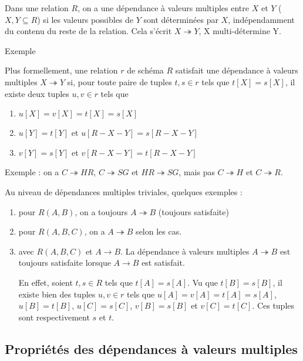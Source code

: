 	Dans une relation $R$, on a une dépendance à valeurs multiples entre $X$ et $Y$ ($X, Y \subseteq R$) si les valeurs possibles de $Y$ sont déterminées par $X$, indépendamment du contenu du reste de la relation. Cela s'écrit $X \twoheadrightarrow Y$, X multi-détermine Y.
	
	Exemple
	
	
	Plus formellement, une relation $r$ de schéma $R$ satisfait une dépendance à valeurs multiples $X \twoheadrightarrow Y$ si, pour toute paire de tuples $t, s \in r$ tels que $t[X] = s[X]$, il existe deux tuples $u, v \in r$ tels que
	
	\begin{enumerate}
		\item $u[X] = v[X] = t[X] = s[X]$
		\item $u[Y] = t[Y]$ et $u[R - X - Y] = s[R - X - Y]$
		\item $v[Y] = s[Y]$ et $v[R - X - Y] = t[R - X - Y]$
	\end{enumerate}
	

	Exemple : on a $C \twoheadrightarrow HR$, $C \twoheadrightarrow SG$ et $HR \twoheadrightarrow SG$, mais pas $ C \twoheadrightarrow H$ et $C \twoheadrightarrow R$.
	
	
	Au niveau de dépendances multiples triviales, quelques exemples :
	
	\begin{enumerate}
		\item pour $R(A, B)$, on a toujours $A \twoheadrightarrow B$ (toujours satisfaite)
		\item pour $R(A, B, C)$, on a $A \twoheadrightarrow B$ selon les cas.
		
		
		\item avec $R(A, B, C)$ et $A \rightarrow B$. La dépendance à valeurs multiples $A \twoheadrightarrow B$ est toujours satisfaite lorsque $A \rightarrow B$ est satisfait.
		
		En effet, soient $t, s \in R$ tels que $t[A] = s[A]$. Vu que $t[B] = s[B]$, il existe bien des tuples $u, v \in r$ tels que $u[A] = v[A] = t[A] = s[A]$, $u[B] = t[B]$, $u[C] = s[C]$, $v[B] = s[B]$ et $v[C] = t[C]$. Ces tuples sont respectivement $s$ et $t$.
	\end{enumerate}
	
	
		\subsection{Propriétés des dépendances à valeurs multiples}
		
